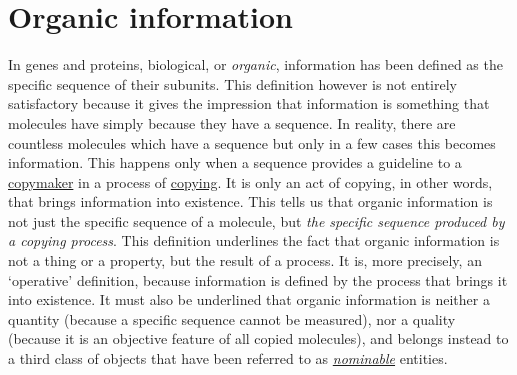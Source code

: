 \documentclass[12pt]{article}
\begin{document}
\section{Organic information}
In genes and proteins, biological, or \textit{organic}, information has been defined as the specific sequence of their subunits. This definition however is not entirely satisfactory because it gives the impression that information is something that molecules have simply because they have a sequence. In reality, there are countless molecules which have a sequence but only in a few cases this becomes information. This happens only when a sequence provides a guideline to a \hyperlink{copymakers}{copymaker} in a process of \hyperlink{copying_and_coding}{copying}. It is only an act of copying, in other words, that brings information into existence. This tells us that organic information is not just the specific sequence of a molecule, but \textit{the specific sequence produced by a copying process}. This definition underlines the fact that organic information is not a thing or a property, but the result of a process. It is, more precisely, an `operative' definition, because information is defined by the process that brings it into existence. It must also be underlined that organic information is neither a \hypertarget{physical_quantities}{quantity} (because a specific sequence cannot be measured), nor a quality (because it is an objective feature of all copied molecules), and belongs instead to a third class of objects that have been referred to as \hyperlink{nominable_entity}{\textit{nominable}} entities.


\hypertarget{organic_meaning}{}
\end{document}
